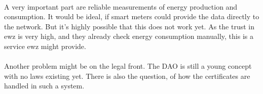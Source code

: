 \documentclass{scrartcl}
\begin{document}
	\paragraph{}
	A very important part are reliable measurements of energy production and consumption. It would be ideal, if smart meters could provide the data directly to the network. But it's highly possible that this does not work yet. As the trust in ewz is very high, and they already check energy consumption manually, this is a service ewz might provide.
	
	\paragraph{}
	Another problem might be on the legal front. The DAO is still a young concept with no laws existing yet. There is also the question, of how the certificates are handled in such a system.  
    
\end{document}
